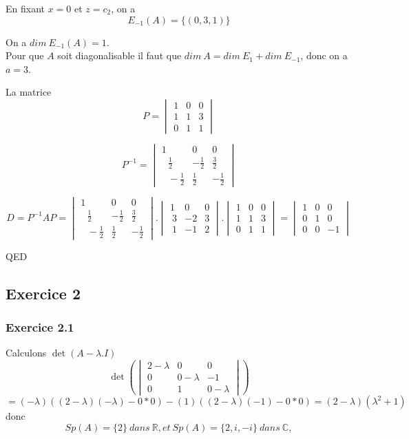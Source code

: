 \documentclass[]{book}
\theoremstyle{definition}
\newcommand{\bb}[1]{\mathbb{#1}}
\newcommand{\R}{\bb{R}}
\newcommand{\C}{\bb{C}}
\begin{document}
En fixant $x=0$ et $z=c_2$, on a
$$
E_{-1}(A)=\{(0,3,1)\}
$$ 

On a $dim\ E_{-1}(A)= 1$.\\

Pour que $A$ soit diagonalisable il faut que $dim\ A = dim\ E_{1} + dim\ E_{-1}$, donc on a $a = 3$.

La matrice
$$P = \begin{vmatrix} 1 & 0 & 0 \\ 1 & 1 & 3 \\  0 & 1 & 1 \end{vmatrix} $$

$$P^{-1} = \begin{vmatrix}1&0&0\\ \:\:\:\frac{1}{2}&-\frac{1}{2}&\frac{3}{2}\\ \:\:\:-\frac{1}{2}&\frac{1}{2}&-\frac{1}{2}\end{vmatrix}$$

$$D = P^{-1}AP = \begin{vmatrix}1&0&0\\ \:\:\:\frac{1}{2}&-\frac{1}{2}&\frac{3}{2}\\ \:\:\:-\frac{1}{2}&\frac{1}{2}&-\frac{1}{2}\end{vmatrix}.\begin{vmatrix}1&0&0\\ \:3&-2&3\\ \:1&-1&2\end{vmatrix}. \begin{vmatrix} 1 & 0 & 0 \\ 1 & 1 & 3 \\  0 & 1 & 1 \end{vmatrix} = \begin{vmatrix}1&0&0\\ 0&1&0\\ 0&0&-1\end{vmatrix} $$

QED


\subsection*{Exercice 2}
\subsubsection*{Exercice 2.1}
Calculons $\det(A-\lambda.I)$
$$\det \left( \begin{vmatrix} 2 - \lambda & 0 & 0 \\ 0 & 0 - \lambda & -1 \\  0 & 1 & 0 -\lambda \end{vmatrix}\right) $$
$$= (-\lambda)((2-\lambda)(-\lambda)-0*0) - (1)((2-\lambda)(-1) -0*0) = (2-\lambda)(\lambda^2+1)$$
donc
$$Sp(A) = \{2\}\ dans\ \R, et\  Sp(A) = \{2,i,-i\}\ dans\ \C,$$
\end{document}
